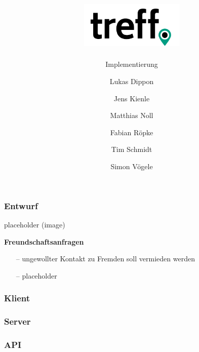\documentclass[aspectratio=1610]{beamer}
\title{\includegraphics[width = 50mm]{images/logo_crop.png}}
\subtitle{\huge Implementierung}
\author{Lukas Dippon
	\and Jens Kienle
	\and Matthias Noll
	\and Fabian Röpke
	\and Tim Schmidt
	\and Simon Vögele}
\begin{document}
	\begin{frame}[plain]
	\maketitle
	\end{frame}

	\begin{frame}[plain]
		\frametitle{Entwurf}

		\begin{minipage}{0.5\textwidth}
		placeholder (image)
		\end{minipage}%
		\begin{minipage}{0.5\textwidth}
		\textbf{Freundschaftsanfragen}
		\begin{itemize}
			\setlength\itemsep{0.3em}
			\item[--] ungewollter Kontakt zu Fremden soll vermieden werden
			\item[--] placeholder
		\end{itemize}
		\end{minipage}

	\end{frame}

	\begin{frame}[plain]
		\frametitle{Klient}

	\end{frame}

	\begin{frame}[plain]
		\frametitle{Server}

	\end{frame}

	\begin{frame}[plain]
		\frametitle{API}

	\end{frame}
\end{document}
